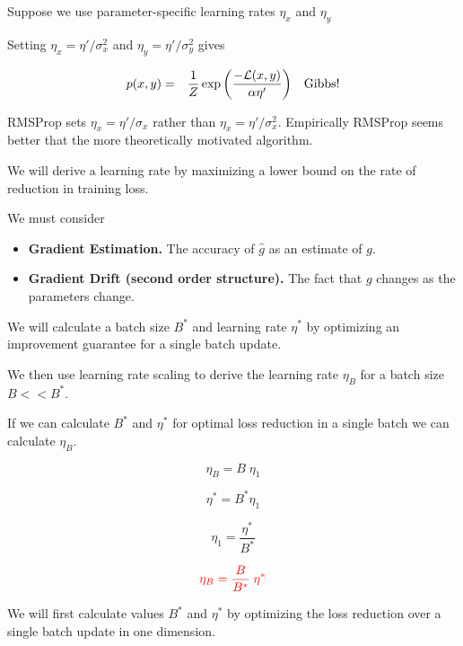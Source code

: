 {

Suppose we use parameter-specific learning rates $\eta_x$ and $\eta_y$

Setting $\eta_x = \eta'/\sigma^2_x$ and $\eta_y = \eta'/\sigma^2_y$ gives

\vfill
\begin{eqnarray*}
p(x,y) & = & \frac{1}{Z} \exp\left(\frac{-{\cal L}(x,y)}{\alpha \eta'}\right)\;\;\;\mathrm{Gibbs!}
\end{eqnarray*}

\vfill
RMSProp sets $\eta_x = \eta'/\sigma_x$ rather than $\eta_x = \eta'/\sigma_x^2$.  Empirically RMSProp seems better that the more
theoretically motivated algorithm.


\vfill
We will derive a learning rate by maximizing a lower bound on the rate of reduction in training loss.

\vfill
We must consider

\vfill
\begin{itemize}
\item {\bf Gradient Estimation.} The accuracy of $\hat{g}$ as an estimate of $g$.

  \vfill
\item {\bf Gradient Drift (second order structure).} The fact that $g$ changes as the parameters change.
\end{itemize}


We will calculate a batch size $B^*$ and learning rate $\eta^*$ by optimizing an improvement guarantee for a single batch update.

\vfill
We then use learning rate scaling to derive the learning rate  $\eta_B$ for a batch size $B << B^*$.


If we can calculate $B^*$ and $\eta^*$ for optimal loss reduction in a single batch
we can calculate $\eta_B$.

\vfill
$$\eta_B = B\;\eta_1$$

\vfill
$$\eta^* = B^* \eta_1$$

\vfill
$$\eta_1 = \frac{\eta^*}{B^*}$$

\vfill
$${\color{red} \eta_B = \frac{B}{B^*} \;\eta^*}$$


We will first calculate values $B^*$ and $\eta^*$ by optimizing the loss reduction over a single batch update in one dimension.

}
